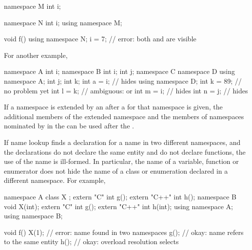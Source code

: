 \begin{codeblock}
namespace M {
  int i;
}

namespace N {
  int i;
  using namespace M;
}

void f() {
  using namespace N;
  i = 7;            // error: both  and  are visible
}
\end{codeblock}

For another example,

\begin{codeblock}
namespace A {
  int i;
}
namespace B {
  int i;
  int j;
  namespace C {
    namespace D {
      using namespace A;
      int j;
      int k;
      int a = i;    //  hides 
    }
    using namespace D;
    int k = 89;     // no problem yet
    int l = k;      // ambiguous:  or 
    int m = i;      //  hides 
    int n = j;      //  hides 
  }
}
\end{codeblock}
\exitexample

\pnum
If a namespace is extended by an
 after a
 for that namespace is given, the additional
members of the extended namespace and the members of namespaces
nominated by  in the
 can be used after the
.

\pnum
If name lookup finds a declaration for a name in two different
namespaces, and the declarations do not declare the same entity and do
not declare functions, the use of the name is ill-formed.
\enternote
In particular, the name of a variable, function or enumerator does not
hide the name of a class or enumeration declared in a different
namespace. For example,

\begin{codeblock}
namespace A {
  class X { };
  extern "C"   int g();
  extern "C++" int h();
}
namespace B {
  void X(int);
  extern "C"   int g();
  extern "C++" int h(int);
}
using namespace A;
using namespace B;

void f() {
  X(1);             // error: name  found in two namespaces
  g();              // okay: name  refers to the same entity
  h();              // okay: overload resolution selects 
}
\end{codeblock}
\exitnote

